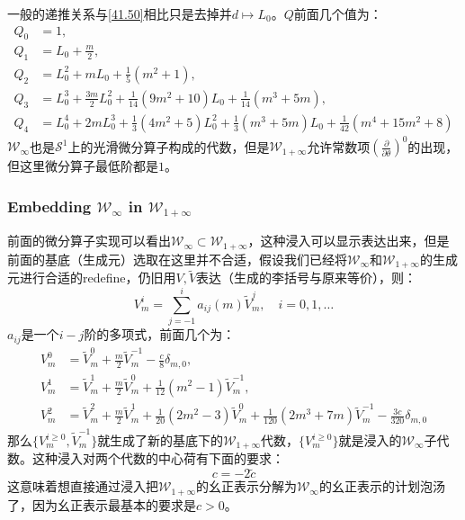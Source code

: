一般的递推关系与\ref{41.50}相比只是去掉$\tilde{ }$并$d\mapsto L_0$。$Q$前面几个值为：
\begin{equation}
	\begin{aligned}
		Q_{0}& =1,  \\
		Q_{1}& =L_0+\frac m2,  \\
		Q_{2} &=L_0^2+mL_0+\frac15(m^2+1),  \\
		Q_{3} &=L_{0}^{3}+\frac{3m}{2}L_{0}^{2}+\frac{1}{14}(9m^{2}+10)L_{0}+\frac{1}{14}(m^{3}+5m),  \\
		Q_{4} &=L_0^4+2mL_0^3+\frac{1}{3}(4m^2+5)L_0^2+\frac{1}{3}(m^3+5m)L_0+\frac{1}{42}(m^4+15m^2+8)
	\end{aligned}
\end{equation}
$\mathcal{W}_{\infty}$也是$\mathcal{S}^{1}$上的光滑微分算子构成的代数，但是$\mathcal{W}_{1+\infty}$允许常数项$\left(\frac{\partial}{\partial\theta}\right)^0$的出现，但这里微分算子最低阶都是$1$。
\subsubsection{Embedding $\mathcal{W}_{\infty}$ in $\mathcal{W}_{1+\infty}$}
前面的微分算子实现可以看出$\mathcal{W}_{\infty}\subset\mathcal{W}_{1+\infty}$，这种浸入可以显示表达出来，但是前面的基底（生成元）选取在这里并不合适，假设我们已经将$\mathcal{W}_\infty$和$\mathcal{W}_{1+\infty}$的生成元进行合适的redefine，仍旧用$V,\widetilde{V}$表达（生成的李括号与原来等价），则：
\begin{equation}
	V_m^i=\sum_{j=-1}^ia_{ij}(m)\widetilde{V}_m^j,\quad i=0,1,\ldots
\end{equation}
$a_{ij}$是一个$i-j$阶的多项式，前面几个为：
\begin{equation}
	\begin{aligned}
		V_{m}^{0} &=\widetilde{V}_m^0+\frac m2\widetilde{V}_m^{-1}-\frac c8\delta_{m,0},  \\
		V_m^{1} &=\widetilde{V}_m^1+\frac m2\widetilde{V}_m^0+\frac1{12}(m^2-1)\widetilde{V}_m^{-1},  \\
		V_{m}^{2} &=\widetilde{V}_m^2+\frac m2\widetilde{V}_m^1+\frac1{20}(2m^2-3)\widetilde{V}_m^0+\frac1{120}(2m^3+7m)\widetilde{V}_m^{-1}-\frac{3c}{320}\delta_{m,0} 
	\end{aligned}
\end{equation}
那么$\{V^{i\geq 0}_m,\widetilde{V}^{-1}_m\}$就生成了新的基底下的$\mathcal{W}_{1+\infty}$代数，$\{V^{i\geq 0}_m\}$就是浸入的$\mathcal{W}_{\infty}$子代数。这种浸入对两个代数的中心荷有下面的要求：
\begin{equation}
	c=-2\tilde{c}
\end{equation}
这意味着想直接通过浸入把$\mathcal{W}_{1+\infty}$的幺正表示分解为$\mathcal{W}_{\infty}$的幺正表示的计划泡汤了，因为幺正表示最基本的要求是$c>0$。
